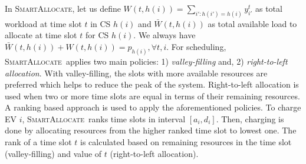 \documentclass[journal]{IEEEtran}
\newcommand{\revv}[1]{{\color{black}#1}}%
\newcommand{\sa}{\textsc{SmartAllocate}}
\begin{document}
		In \sa, 
		let us define $W(t,h(i))=\sum_{i': h(i')=h(i)} y_{i'}^t$ as total workload at time slot $t$ in CS $h(i)$ and $\bar{W}(t,h(i))$ as total available load to allocate at time slot $t$ for CS $h(i)$. We always have ${\bar{W}(t,h(i))+W(t,h(i))=p_{h(i)},  \forall t, i}$. For scheduling, \sa\ applies two main policies: 1) \emph{valley-filling} and, 2) \emph{right-to-left allocation}. \revv{With valley-filling, the slots with more available resources are preferred which helps to reduce the peak of the system.} %
				Right-to-left allocation is used when two or more time slots are equal in terms of their remaining resources. 
A ranking based approach is used to apply the aforementioned policies. 
		To charge  EV $i$, \sa\ ranks time slots in interval $[a_i,d_i]$. Then, charging is done by allocating resources from the higher ranked time slot to lowest one. The rank of a time slot $t$ is calculated based on remaining resources in the time slot (valley-filling) and value of $t$ (right-to-left allocation). 
		
\end{document}
